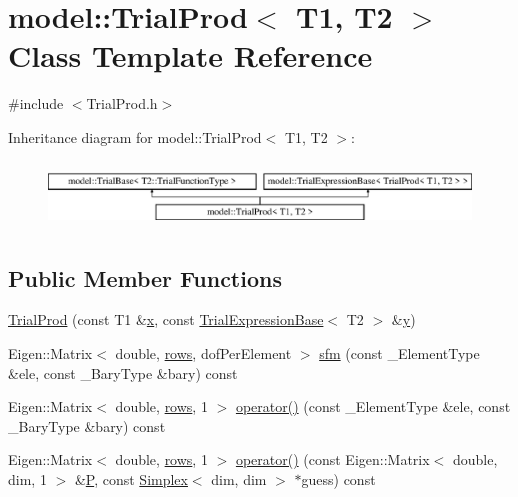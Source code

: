 \hypertarget{classmodel_1_1_trial_prod}{}\section{model\+:\+:Trial\+Prod$<$ T1, T2 $>$ Class Template Reference}
\label{classmodel_1_1_trial_prod}


{\ttfamily \#include $<$Trial\+Prod.\+h$>$}

Inheritance diagram for model\+:\+:Trial\+Prod$<$ T1, T2 $>$\+:\begin{figure}[H]
\begin{center}
\leavevmode
\includegraphics[height=1.800643cm]{classmodel_1_1_trial_prod}
\end{center}
\end{figure}
\subsection*{Public Member Functions}
\begin{DoxyCompactItemize}
\item 
\hyperlink{classmodel_1_1_trial_prod_a990dd3eb05d37e5b92457033aa17f15b}{Trial\+Prod} (const T1 \&\hyperlink{generate_s_t_lcyl_8m_a9336ebf25087d91c818ee6e9ec29f8c1}{x}, const \hyperlink{structmodel_1_1_trial_expression_base}{Trial\+Expression\+Base}$<$ T2 $>$ \&\hyperlink{generate_s_t_lcyl_8m_a2fb1c5cf58867b5bbc9a1b145a86f3a0}{y})
\item 
Eigen\+::\+Matrix$<$ double, \hyperlink{classmodel_1_1_trial_prod_acc48d5abcad27e2c9b9117d580c22a86}{rows}, dof\+Per\+Element $>$ \hyperlink{classmodel_1_1_trial_prod_a1324f5426747d0b4edfe546b57d2c569}{sfm} (const \+\_\+\+Element\+Type \&ele, const \+\_\+\+Bary\+Type \&bary) const 
\item 
Eigen\+::\+Matrix$<$ double, \hyperlink{classmodel_1_1_trial_prod_acc48d5abcad27e2c9b9117d580c22a86}{rows}, 1 $>$ \hyperlink{classmodel_1_1_trial_prod_a1b3da7e7247e14552a051f5622938f0c}{operator()} (const \+\_\+\+Element\+Type \&ele, const \+\_\+\+Bary\+Type \&bary) const 
\item 
Eigen\+::\+Matrix$<$ double, \hyperlink{classmodel_1_1_trial_prod_acc48d5abcad27e2c9b9117d580c22a86}{rows}, 1 $>$ \hyperlink{classmodel_1_1_trial_prod_a0dd8340d5a96fcbe398fae20e4088ea1}{operator()} (const Eigen\+::\+Matrix$<$ double, dim, 1 $>$ \&\hyperlink{_f_e_m_2linear__elasticity__3d_2tetgen_2generate_p_o_l_ycube_8m_a50a9afb44201a65ab7ad5feb2150aeb6}{P}, const \hyperlink{classmodel_1_1_simplex}{Simplex}$<$ dim, dim $>$ $\ast$guess) const 
\end{DoxyCompactItemize}
